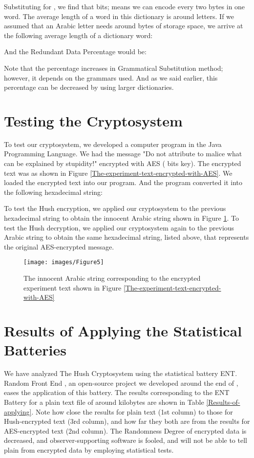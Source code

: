 \documentclass{acm_proc_article-sp}
\begin{document}
Substituting  for , we find that  bits; means we can encode every two bytes in one word. The average length of a word in this dictionary is around  letters. If we assumed that an Arabic letter needs around  bytes of storage space, we arrive at the following average length of a dictionary word:

And the Redundant Data Percentage would be:

Note that the percentage increases in Grammatical Substitution method; however, it depends on the grammars used. And as we said earlier, this percentage can be decreased by using larger dictionaries.

\section{Testing the Cryptosystem}\label{Testing-the-Cryptosystem}
To test our cryptosystem, we developed a computer program in the Java Programming Language. We had the message "Do not attribute to malice what can be explained by stupidity!" encrypted with AES ( bits key). The encrypted text was as shown in Figure \ref{The-experiment-text-encrypted-with-AES}. We loaded the encrypted text into our program. And the program converted it into the following hexadecimal string:

To test the Hush encryption, we applied our cryptosystem to the previous hexadecimal string to obtain the innocent Arabic string shown in Figure \ref{The-innocent-Arabic-string}. To test the Hush decryption, we applied our cryptosystem again to the previous Arabic string to obtain the same hexadecimal string, listed above, that represents the original AES-encrypted message.

\begin{figure}
  \centering
  \texttt{[image: images/Figure5]}
  \caption{The innocent Arabic string corresponding to the encrypted experiment text shown in Figure \ref{The-experiment-text-encrypted-with-AES}}\label{The-innocent-Arabic-string}
\end{figure}

\section{Results of Applying the Statistical Batteries}\label{Results-of-Applying-the-Statistical-Batteries}
We have analyzed The Hush Cryptosystem using the statistical battery ENT. Random Front End \cite{Hussein}, an open-source project we developed around the end of , eases the application of this battery. The results corresponding to the ENT Battery for a plain text file of around  kilobytes are shown in Table \ref{Results-of-applying}. Note how close the results for plain text (1st column) to those for Hush-encrypted text (3rd column), and how far they both are from the results for AES-encrypted text (2nd column). The Randomness Degree of encrypted data is decreased, and observer-supporting software is fooled, and will not be able to tell plain from encrypted data by employing statistical tests.
\end{document}

